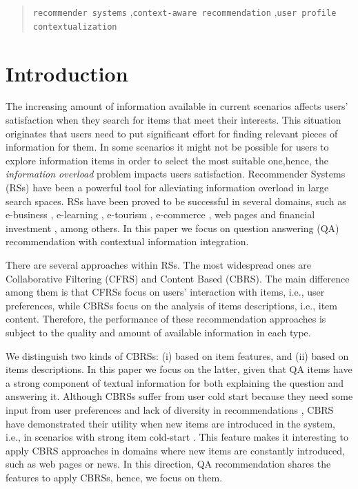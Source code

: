 \documentclass[preprint]{elsarticle}
\begin{document}
\begin{spacing}{1.5}
\begin{frontmatter}
\begin{abstract}
\begin{keyword}
   \texttt{recommender systems} \sep \texttt{context-aware recommendation} \sep \texttt{user profile contextualization}
\end{keyword}
\end{abstract}

\end{frontmatter}

\section{Introduction}\label{sec:introduction}

The increasing amount of information available in current scenarios affects users' satisfaction when they search for items that meet their interests. This situation originates that users need to put significant effort for finding relevant pieces of information for them. In some scenarios it might not be possible for users to explore information items in order to select the most suitable one,hence, the \emph{information overload} problem impacts users satisfaction. Recommender Systems (RSs) have been a powerful tool for alleviating information overload in large search spaces. RSs have been proved to be successful in several domains, such as e-business \cite{Lu2013}, e-learning \cite{Wu2015,Yera2014}, e-tourism \cite{AlHassan2015,Noguera2012}, e-commerce \cite{Rafailidis2016}, web pages \cite{Nguyen2014,Xuan2015} and financial investment \cite{Musto2015}, among others. In this paper we focus on question answering (QA) recommendation with contextual information integration.

There are several approaches within RSs. The most widespread ones are Collaborative Filtering (CFRS) and Content Based (CBRS). The main difference among them is that CFRSs focus on users' interaction with items, i.e., user preferences, while CBRSs focus on the analysis of items descriptions, i.e., item content. Therefore, the performance of these recommendation approaches is subject to the quality and amount of available information in each type.

We distinguish two kinds of CBRSs: (i) based on item features, and (ii) based on items descriptions. In this paper we focus on the latter, given that QA items have a strong component of textual information for both explaining the question and answering it. Although CBRSs suffer from user cold start because they need some input from user preferences and lack of diversity in recommendations \cite{Barragans2010}, CBRS have demonstrated their utility when new items are introduced in the system, i.e., in scenarios with strong item cold-start \cite{Aggarwal2016}. This feature makes it interesting to apply CBRS approaches in domains where new items are constantly introduced, such as web pages or news. In this direction, QA recommendation shares the features to apply CBRSs, hence, we focus on them.


\end{spacing}
\end{document}
